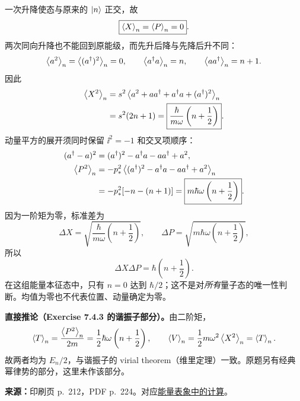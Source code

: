 \begin{checkedsolution}
一次升降使态与原来的 $\left|n\right\rangle$ 正交，故
\begin{equation}
  \boxed{\left\langle X \right\rangle_n=\left\langle P \right\rangle_n=0}.
\end{equation}
两次同向升降也不能回到原能级，而先升后降与先降后升不同：
\begin{equation}
  \left\langle a^2 \right\rangle_n=\left\langle (a^\dagger)^2 \right\rangle_n=0,\qquad
  \left\langle a^\dagger a \right\rangle_n=n,\qquad\left\langle aa^\dagger \right\rangle_n=n+1.
\end{equation}
因此
\begin{align}
  \left\langle X^2 \right\rangle_n
    &=s^2\left\langle a^2+aa^\dagger+a^\dagger a+(a^\dagger)^2 \right\rangle_n\\
    &=s^2(2n+1)
     =\boxed{\frac{\hbar}{m\omega}\left(n+\frac12\right)}.
\end{align}
动量平方的展开须同时保留 $\ii^2=-1$ 和交叉项顺序：
\begin{align}
  (a^\dagger-a)^2&=(a^\dagger)^2-a^\dagger a-aa^\dagger+a^2,\\
  \left\langle P^2 \right\rangle_n
    &=-p_*^2\left\langle (a^\dagger)^2-a^\dagger a-aa^\dagger+a^2 \right\rangle_n\\
    &=-p_*^2[-n-(n+1)]
     =\boxed{m\hbar\omega\left(n+\frac12\right)}.
\end{align}
因为一阶矩为零，标准差为
\begin{equation}
  \Delta X=\sqrt{\frac{\hbar}{m\omega}\left(n+\frac12\right)},\qquad
  \Delta P=\sqrt{m\hbar\omega\left(n+\frac12\right)},
\end{equation}
所以
\begin{equation}
  \boxed{\Delta X\Delta P=\hbar\left(n+\frac12\right)}.
\end{equation}
在这组能量本征态中，只有 $n=0$ 达到 $\hbar/2$；这不是对\emph{所有}量子态的唯一性判断。均值为零也不代表位置、动量确定为零。

\textbf{直接推论（Exercise 7.4.3 的谐振子部分）。}由二阶矩，
\begin{equation}
  \left\langle T \right\rangle_n=\frac{\left\langle P^2 \right\rangle_n}{2m}
    =\frac12\hbar\omega\left(n+\frac12\right),\qquad
  \left\langle V \right\rangle_n=\frac12m\omega^2\left\langle X^2 \right\rangle_n=\left\langle T \right\rangle_n.
\end{equation}
故两者均为 $E_n/2$，与谐振子的 virial theorem（维里定理）一致。原题另有经典幂律势的部分，这里未作该部分。
\end{checkedsolution}

\textbf{来源：}印刷页 p.~212，PDF p.~224。对应\hyperref[topic:QM-C07-S04-T03]{能量表象中的计算}。

